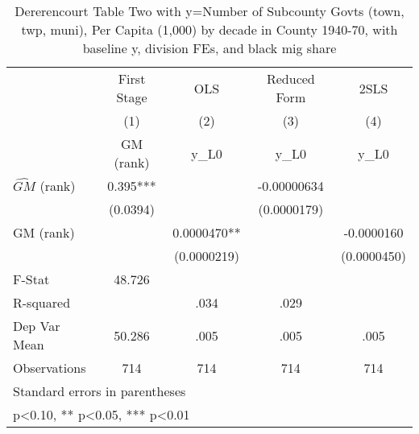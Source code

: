 \begin{table}[htbp]\centering
\def\sym#1{\ifmmode^{#1}\else\(^{#1}\)\fi}
\caption{Dererencourt Table Two with y=Number of Subcounty Govts (town, twp, muni), Per Capita (1,000) by decade in County 1940-70, with baseline y, division FEs, and black mig share}
\begin{tabular}{l*{4}{c}}
\toprule
                    & First Stage   &         OLS   &Reduced Form   &        2SLS   \\
                    &\multicolumn{1}{c}{(1)}&\multicolumn{1}{c}{(2)}&\multicolumn{1}{c}{(3)}&\multicolumn{1}{c}{(4)}\\
                    &\multicolumn{1}{c}{GM  (rank)}&\multicolumn{1}{c}{y\_L0}&\multicolumn{1}{c}{y\_L0}&\multicolumn{1}{c}{y\_L0}\\
\midrule
$\hat{GM}$ (rank)   &       0.395***&               & -0.00000634   &               \\
                    &    (0.0394)   &               & (0.0000179)   &               \\
\addlinespace
GM  (rank)          &               &   0.0000470** &               &  -0.0000160   \\
                    &               & (0.0000219)   &               & (0.0000450)   \\
\midrule
F-Stat              &      48.726   &               &               &               \\
R-squared           &               &        .034   &        .029   &               \\
Dep Var Mean        &      50.286   &        .005   &        .005   &        .005   \\
Observations        &         714   &         714   &         714   &         714   \\
\bottomrule
\multicolumn{5}{l}{\footnotesize Standard errors in parentheses}\\
\multicolumn{5}{l}{\footnotesize * p<0.10, ** p<0.05, *** p<0.01}\\
\end{tabular}
\end{table}
